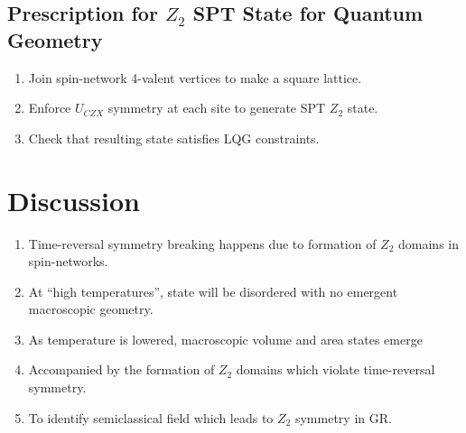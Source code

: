 \documentclass[a0,portrait]{a0poster}
\begin{document}
\begin{multicols}{3}
\subsection*{Prescription for $ Z_2 $ SPT State for Quantum Geometry }

\begin{enumerate}
	\item Join spin-network 4-valent vertices to make a square lattice.
	\item Enforce $ U_{CZX} $ symmetry at each site to generate SPT $ Z_2 $ state.
	\item Check that resulting state satisfies LQG constraints.
\end{enumerate}






\color{DarkGreen}

\section*{Discussion}

\begin{enumerate}
	\item Time-reversal symmetry breaking happens due to formation of $ Z_2 $ domains in spin-networks.
	\item At ``high temperatures'', state will be disordered with no emergent macroscopic geometry.
	\item As temperature is lowered, macroscopic volume and area states emerge
	\item Accompanied by the formation of $ Z_2 $ domains which violate time-reversal symmetry.
	\item To identify semiclassical field which leads to $ Z_2 $ symmetry in GR.
\end{enumerate}




\end{multicols}
\end{document}
